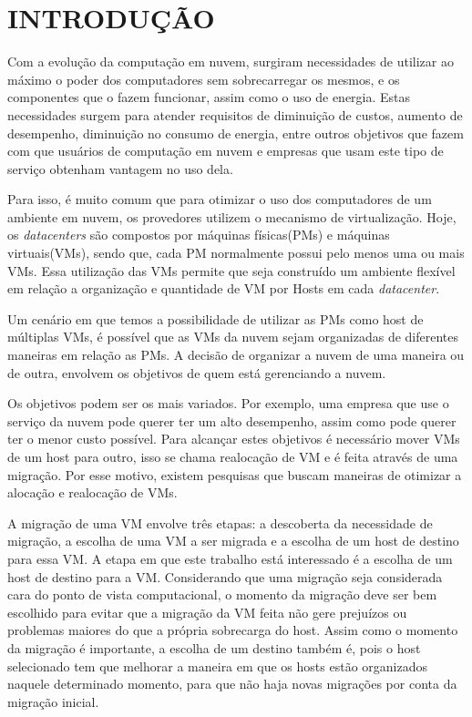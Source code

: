 \chapter{INTRODUÇÃO}
\label{chap:introducao}

Com a evolução da computação em nuvem, surgiram necessidades de utilizar ao 
máximo o poder dos computadores sem sobrecarregar os mesmos, e os componentes que o fazem funcionar,
assim como o uso de energia. Estas necessidades surgem para atender 
requisitos de diminuição de custos, aumento de desempenho, diminuição no consumo de energia,
entre outros objetivos que fazem com que usuários de computação em nuvem e empresas que usam 
este tipo de serviço obtenham vantagem no uso dela.

Para isso, é muito comum que para otimizar o uso dos computadores de um ambiente em nuvem, 
os provedores utilizem o mecanismo de virtualização. Hoje, os \textit{datacenters} são compostos 
por máquinas físicas(PMs) e máquinas virtuais(VMs), sendo que, cada PM normalmente possui 
pelo menos uma ou mais VMs. Essa utilização das VMs permite que seja construído um ambiente flexível
em relação a organização e quantidade de VM por Hosts em cada \textit{datacenter}.

Um cenário em que temos a possibilidade de utilizar as PMs como host de múltiplas VMs,
é possível que as VMs da nuvem sejam organizadas de diferentes maneiras em relação as PMs. A decisão
de organizar a nuvem de uma maneira ou de outra, envolvem os objetivos de quem está gerenciando a nuvem. 
 
 Os objetivos podem ser os mais variados. Por exemplo, uma empresa que 
 use o serviço da nuvem pode querer ter um alto desempenho, assim como pode querer ter o menor custo 
 possível. Para alcançar estes objetivos é necessário mover VMs de um host para outro, isso se chama
 realocação de VM e é feita através de uma migração. 
 Por esse motivo, existem pesquisas que buscam maneiras de otimizar a alocação e realocação de VMs.

A migração de uma VM envolve três etapas: a descoberta da necessidade de migração, 
a escolha de uma VM a ser migrada e a escolha de um host de destino para essa VM.
A etapa em que este trabalho está interessado é a escolha de um host de destino para a VM. 
Considerando que uma migração seja considerada cara do ponto de vista computacional, 
o momento da migração deve ser bem escolhido para evitar que a migração da VM feita não gere  
prejuízos ou problemas maiores do que a própria sobrecarga do host. 
Assim como o momento da migração é importante, a escolha de um destino também é, 
pois o host selecionado tem que melhorar a maneira em que os hosts estão organizados naquele determinado momento, 
para que não haja novas migrações por conta da migração inicial.

